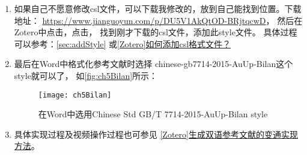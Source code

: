 \documentclass[theorem=false,mathfont=none,openany,sub3section]{easybook}
\begin{document}
{\begin{enumerate}
\begin{lstlisting}
		[2] SUKAN G, ANDREWS A T. Application of the plastein reaction to caseins and to skim-milk powder: I. Protein hydrolysis and plastein formation[J]. Journal of Dairy Research, 1982,49(2):265–278. 
		Application of the plastein reaction to caseins and to skim-milk powder.
		
		[3] UDENIGWE C C, WU S, DRUMMOND K, 等. Revisiting the prospects of plastein: thermal and simulated gastric stability in relation to the antioxidative capacity of casein plastein[J]. Journal of Agricultural and Food Chemistry, 2014,62(1):130–135. 
		Revisiting the prospects of plastein.
		
		[4] 张娟娟, 刘尊英, 董士远, 等. 锌离子结合类蛋白反应修饰肽的稳定性研究[J]. 现代食品科技, 2015,31(09):150–154. 
		ZHANG J J,LIU J Y,DONG S Y,et al. Stability of modified peptide using zinc binding and plastein reaction [J]. Modern Food Science and Technology, 2015, 31(09): 150–154.
		
		[5] 朱磊, 张馨心, 谢艳英, 等. 类蛋白反应的作用机制及其对海洋源蛋白修饰的研究进展[J]. 食品工业科技, 2020,41(09):362–367. 
		ZHU L,ZHANG X X,XIE Y Y,et al. Research progress on mechanism of plastein reactions and its modification function of marine proteins [J]. Science and Technology of Food Industry, 2020, 41(09): 362–367.
	\end{lstlisting}
	\item 如果自己不愿意修改csl文件，可以下载我修改的，放到自己能找到位置。下载地址：
	\url{https://www.jianguoyun.com/p/DU5V1AkQtOD-BRjtqcwD}，
	然后在Zotero中点击，点击\menu{+}，
	找到刚才下载的csl文件，添加此style文件。
	具体过程可以参考：\cref{sec:addStyle}
	或\href{https://zhuanlan.zhihu.com/p/64624484}{[Zotero]如何添加csl格式文件？}
	\item 	
	最后在Word中格式化参考文献时选择
	chinese-gb7714-2015-AuUp-Bilan这个style就可以了，
	如\autoref{fig:ch5Bilan}所示：
	\begin{figure}[ht]
		\centering
		\texttt{[image: ch5Bilan]}
		\caption{在Word中选用Chinese Std GB/T 7714-2015-AuUp-Bilan style}
		\label{fig:ch5Bilan}
	\end{figure}
	
	\item 	具体实现过程及视频操作过程也可参见
	\href{https://zhuanlan.zhihu.com/p/282826403}
	{[Zotero]生成双语参考文献的变通实现方法}。
\end{enumerate}


}
\end{document}
